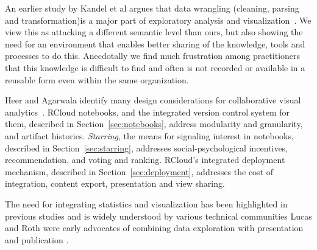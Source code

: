 An earlier study by Kandel et al argues that data wrangling
(cleaning, parsing and transformation)is a major part of exploratory
analysis and visualization~\cite{Kandel:2011:RDI}. We view this
as attacking a different semantic level than ours, but also
showing the need for an environment that enables better sharing
of the knowledge, tools and processes to do this. Anecdotally
we find much frustration among practitioners that this knowledge
is difficult to find and often is not recorded or available in a
reusable form even within the same organization.

Heer and Agarwala identify many design considerations for
collaborative visual analytics~\cite{Heer:2008:DCF}.
RCloud notebooks, and the integrated version control system for them,
described in Section~\ref{sec:notebooks}, address modularity and granularity,
and artifact histories.
\emph{Starring}, the means for signaling interest in notebooks, described in
Section~\ref{sec:starring}, addresses social-psychological incentives,
recommendation, and voting and ranking. RCloud's integrated deployment
mechanism, described in Section~\ref{sec:deployment}, addresses the cost of
integration, content export, presentation and view sharing.

The need for integrating statistics and visualization has been
highlighted in previous studies and is widely understood by
various technical communities \cite{Perer:2008:ISA}
Lucas and Roth were early advocates of combining
data exploration with presentation and publication \cite{Lucas:1996:EIV}.

